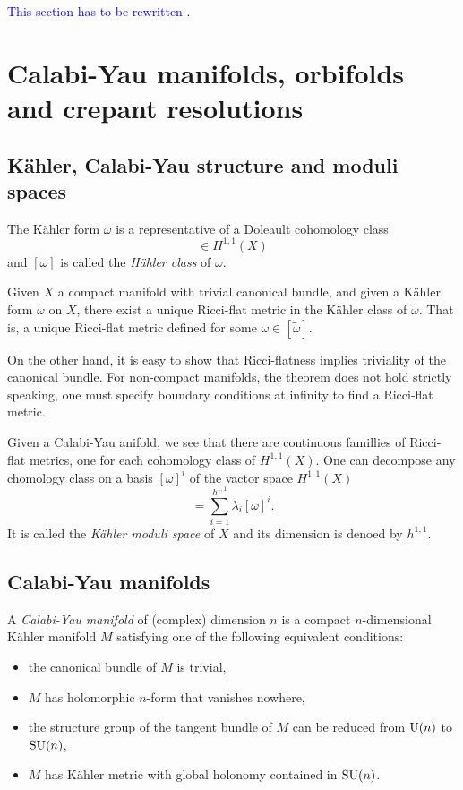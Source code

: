     \textcolor{blue}{This section has to be rewritten \marker.}

\section{Calabi-Yau manifolds, orbifolds and crepant resolutions}\label{sec:CY}

    \subsection{Kähler, Calabi-Yau structure and moduli spaces}

        The Kähler form $\omega$ is a representative of a Doleault cohomology class
        \begin{equation}
            [\omega]\in H^{1,1}(X)
        \end{equation}
        and $[\omega]$ is called the \emph{Hähler class} of $\omega$.
        \begin{theorem}
            Given $X$ a compact manifold with trivial canonical bundle, and given a Kähler form $\tilde{\omega}$ on $X$, there exist a unique Ricci-flat metric in the Kähler class of $\tilde{\omega}$. That is, a unique Ricci-flat metric defined for some $\omega\in[\tilde{\omega}]$.
        \end{theorem}
        On the other hand, it is easy to show that Ricci-flatness implies triviality of the canonical bundle. For non-compact manifolds, the theorem does not hold strictly speaking, one must specify boundary conditions at infinity to find a Ricci-flat metric.

        Given a Calabi-Yau anifold, we see that there are continuous famillies of Ricci-flat metrics, one for each cohomology class of $H^{1,1}(X)$. One can decompose any chomology class on a basis $[\omega]^i$ of the vactor space $H^{1,1}(X)$
        \begin{equation}
            [\omega]=\sum^{h^{1,1}}_{i=1}\lambda_i[\omega]^i.
        \end{equation}
        It is called the \emph{Kähler moduli space} of $X$ and its dimension is denoed by $h^{1,1}$.

    \subsection{Calabi-Yau manifolds}

        A \emph{Calabi-Yau manifold} of (complex) dimension $n$ is a compact $n$-dimensional Kähler manifold $M$ satisfying one of the following equivalent conditions:
        \begin{itemize}
            \item the canonical bundle of $M$ is trivial,
            \item $M$ has holomorphic $n$-form that vanishes nowhere,
            \item the structure group of the tangent bundle of $M$ can be reduced from $\text{U}(n)$ to $\text{SU}(n)$,
            \item $M$ has Kähler metric with global holonomy contained in $\text{SU}(n)$.
        \end{itemize}

